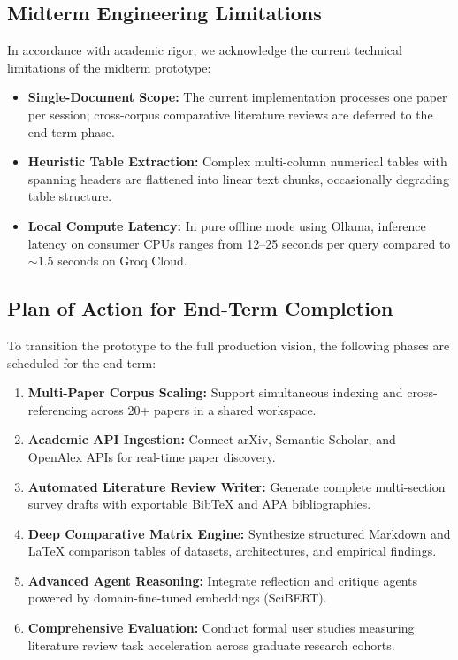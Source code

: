 \documentclass[conference]{IEEEtran}
\begin{document}
\subsection{Midterm Engineering Limitations}
In accordance with academic rigor, we acknowledge the current technical limitations of the midterm prototype:
\begin{itemize}
    \item \textbf{Single-Document Scope:} The current implementation processes one paper per session; cross-corpus comparative literature reviews are deferred to the end-term phase.
    \item \textbf{Heuristic Table Extraction:} Complex multi-column numerical tables with spanning headers are flattened into linear text chunks, occasionally degrading table structure.
    \item \textbf{Local Compute Latency:} In pure offline mode using Ollama, inference latency on consumer CPUs ranges from 12--25 seconds per query compared to $\sim 1.5$ seconds on Groq Cloud.
\end{itemize}

\subsection{Plan of Action for End-Term Completion}
To transition the prototype to the full production vision, the following phases are scheduled for the end-term:
\begin{enumerate}
    \item \textbf{Multi-Paper Corpus Scaling:} Support simultaneous indexing and cross-referencing across 20+ papers in a shared workspace.
    \item \textbf{Academic API Ingestion:} Connect arXiv, Semantic Scholar, and OpenAlex APIs for real-time paper discovery.
    \item \textbf{Automated Literature Review Writer:} Generate complete multi-section survey drafts with exportable BibTeX and APA bibliographies.
    \item \textbf{Deep Comparative Matrix Engine:} Synthesize structured Markdown and LaTeX comparison tables of datasets, architectures, and empirical findings.
    \item \textbf{Advanced Agent Reasoning:} Integrate reflection and critique agents powered by domain-fine-tuned embeddings (SciBERT).
    \item \textbf{Comprehensive Evaluation:} Conduct formal user studies measuring literature review task acceleration across graduate research cohorts.
\end{enumerate}
\end{document}
